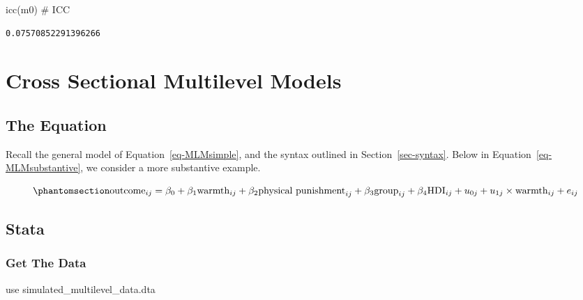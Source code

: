 \documentclass[
  letterpaper,
  DIV=11,
  numbers=noendperiod]{scrreprt}
\newenvironment{Shaded}{\begin{snugshade}}{\end{snugshade}}
\newcommand{\CommentTok}[1]{\textcolor[rgb]{0.37,0.37,0.37}{#1}}
\newcommand{\FunctionTok}[1]{\textcolor[rgb]{0.28,0.35,0.67}{#1}}
\newcommand{\KeywordTok}[1]{\textcolor[rgb]{0.00,0.23,0.31}{#1}}
\newcommand{\NormalTok}[1]{\textcolor[rgb]{0.00,0.23,0.31}{#1}}
\begin{document}
\begin{Shaded}
\begin{Highlighting}[]

\FunctionTok{icc}\NormalTok{(m0) }\CommentTok{\# ICC}
\end{Highlighting}
\end{Shaded}

\begin{verbatim}
0.07570852291396266
\end{verbatim}


\chapter{Cross Sectional Multilevel
Models}\label{cross-sectional-multilevel-models}

\section{The Equation}\label{the-equation-1}

Recall the general model of Equation~\ref{eq-MLMsimple}, and the syntax
outlined in Section~\ref{sec-syntax}. Below in
Equation~\ref{eq-MLMsubstantive}, we consider a more substantive
example.

\begin{equation}\phantomsection\label{eq-MLMsubstantive}{\text{outcome}_{ij}= \beta_0 + \beta_1 \text{warmth}_{ij} + \beta_2 \text{physical punishment}_{ij} + \\ \beta_3 \text{group}_{ij} + \beta_4 \text{HDI}_{ij} + \\ u_{0j} + u_{1j} \times \text{warmth}_{ij} + e_{ij}}\end{equation}

\section{Stata}

\subsection{Get The Data}\label{get-the-data}

\begin{Shaded}
\begin{Highlighting}[]

\KeywordTok{use}\NormalTok{ simulated\_multilevel\_data.dta}
\end{Highlighting}
\end{Shaded}
\end{document}

